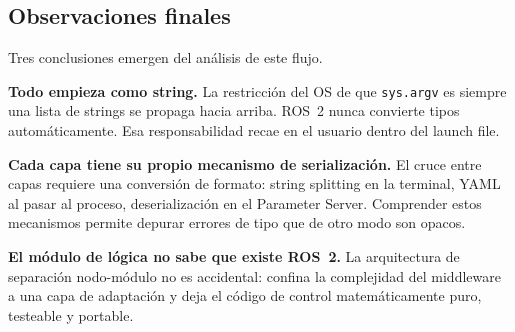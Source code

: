 \subsection{Observaciones finales}

Tres conclusiones emergen del análisis de este flujo.

\textbf{Todo empieza como string.} La restricción del OS de que \texttt{sys.argv} es siempre una lista de strings se propaga hacia arriba. ROS~2 nunca convierte tipos automáticamente. Esa responsabilidad recae en el usuario dentro del launch file.

\textbf{Cada capa tiene su propio mecanismo de serialización.} El cruce entre capas requiere una conversión de formato: string splitting en la terminal, YAML al pasar al proceso, deserialización en el Parameter Server. Comprender estos mecanismos permite depurar errores de tipo que de otro modo son opacos.

\textbf{El módulo de lógica no sabe que existe ROS~2.} La arquitectura de separación nodo-módulo no es accidental: confina la complejidad del middleware a una capa de adaptación y deja el código de control matemáticamente puro, testeable y portable.
